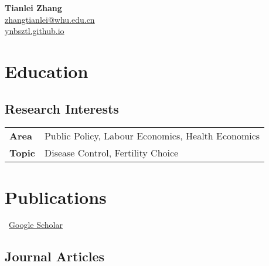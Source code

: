 \documentclass[11pt]{article} %
\newcommand{\mytitle}[4]{
  \begin{center}
    \Large\textbf{#1}\normalsize \\ %
    \href{mailto:#2}{#2} \\ %
    \href{https://#3}{#3} \\ %
    #4 %
  \end{center}
}
\begin{document}
\mytitle{Tianlei Zhang}{zhangtianlei@whu.edu.cn}{ynbsztl.github.io} %


\RaggedRight


\section*{Education}


%

\subsection*{Research Interests}\label{ri}

\begin{longtable}[l]{@{}p{} p{}}

    \textbf{Area} & Public Policy, Labour Economics, Health Economics \\
    \textbf{Topic} & Disease Control, Fertility Choice  \\
    
\end{longtable}

\section*{Publications}
\label{pubs}

\vspace{-.75em}
\small
\faGoogle~\href{https://scholar.google.com/citations?hl=zh-CN&user=zsO6zkYAAAAJ}{Google Scholar}\\
\normalsize


\subsection*{Journal Articles}
\label{journal-article}
\newrefcontext[labelprefix=J] %
\nocite{*} %
\printbibliography[
    type=article, %
    heading=none, %
    resetnumbers=true, %
    keyword=J %
]
\end{document}

